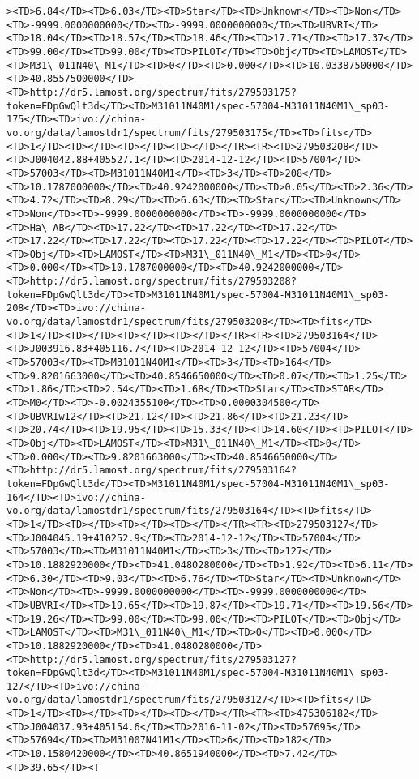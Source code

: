 \documentclass[11pt]{article}
\begin{document}
\begin{Verbatim}[commandchars=\\\{\}]
><TD>6.84</TD><TD>6.03</TD><TD>Star</TD><TD>Unknown</TD><TD>Non</TD><TD>-9999.0000000000</TD><TD>-9999.0000000000</TD><TD>UBVRI</TD><TD>18.04</TD><TD>18.57</TD><TD>18.46</TD><TD>17.71</TD><TD>17.37</TD><TD>99.00</TD><TD>99.00</TD><TD>PILOT</TD><TD>Obj</TD><TD>LAMOST</TD><TD>M31\_011N40\_M1</TD><TD>0</TD><TD>0.000</TD><TD>10.0338750000</TD><TD>40.8557500000</TD><TD>http://dr5.lamost.org/spectrum/fits/279503175?token=FDpGwQlt3d</TD><TD>M31011N40M1/spec-57004-M31011N40M1\_sp03-175</TD><TD>ivo://china-vo.org/data/lamostdr1/spectrum/fits/279503175</TD><TD>fits</TD><TD>1</TD><TD></TD><TD></TD><TD></TD></TR><TR><TD>279503208</TD><TD>J004042.88+405527.1</TD><TD>2014-12-12</TD><TD>57004</TD><TD>57003</TD><TD>M31011N40M1</TD><TD>3</TD><TD>208</TD><TD>10.1787000000</TD><TD>40.9242000000</TD><TD>0.05</TD><TD>2.36</TD><TD>4.72</TD><TD>8.29</TD><TD>6.63</TD><TD>Star</TD><TD>Unknown</TD><TD>Non</TD><TD>-9999.0000000000</TD><TD>-9999.0000000000</TD><TD>Ha\_AB</TD><TD>17.22</TD><TD>17.22</TD><TD>17.22</TD><TD>17.22</TD><TD>17.22</TD><TD>17.22</TD><TD>17.22</TD><TD>PILOT</TD><TD>Obj</TD><TD>LAMOST</TD><TD>M31\_011N40\_M1</TD><TD>0</TD><TD>0.000</TD><TD>10.1787000000</TD><TD>40.9242000000</TD><TD>http://dr5.lamost.org/spectrum/fits/279503208?token=FDpGwQlt3d</TD><TD>M31011N40M1/spec-57004-M31011N40M1\_sp03-208</TD><TD>ivo://china-vo.org/data/lamostdr1/spectrum/fits/279503208</TD><TD>fits</TD><TD>1</TD><TD></TD><TD></TD><TD></TD></TR><TR><TD>279503164</TD><TD>J003916.83+405116.7</TD><TD>2014-12-12</TD><TD>57004</TD><TD>57003</TD><TD>M31011N40M1</TD><TD>3</TD><TD>164</TD><TD>9.8201663000</TD><TD>40.8546650000</TD><TD>0.07</TD><TD>1.25</TD><TD>1.86</TD><TD>2.54</TD><TD>1.68</TD><TD>Star</TD><TD>STAR</TD><TD>M0</TD><TD>-0.0024355100</TD><TD>0.0000304500</TD><TD>UBVRIw12</TD><TD>21.12</TD><TD>21.86</TD><TD>21.23</TD><TD>20.74</TD><TD>19.95</TD><TD>15.33</TD><TD>14.60</TD><TD>PILOT</TD><TD>Obj</TD><TD>LAMOST</TD><TD>M31\_011N40\_M1</TD><TD>0</TD><TD>0.000</TD><TD>9.8201663000</TD><TD>40.8546650000</TD><TD>http://dr5.lamost.org/spectrum/fits/279503164?token=FDpGwQlt3d</TD><TD>M31011N40M1/spec-57004-M31011N40M1\_sp03-164</TD><TD>ivo://china-vo.org/data/lamostdr1/spectrum/fits/279503164</TD><TD>fits</TD><TD>1</TD><TD></TD><TD></TD><TD></TD></TR><TR><TD>279503127</TD><TD>J004045.19+410252.9</TD><TD>2014-12-12</TD><TD>57004</TD><TD>57003</TD><TD>M31011N40M1</TD><TD>3</TD><TD>127</TD><TD>10.1882920000</TD><TD>41.0480280000</TD><TD>1.92</TD><TD>6.11</TD><TD>6.30</TD><TD>9.03</TD><TD>6.76</TD><TD>Star</TD><TD>Unknown</TD><TD>Non</TD><TD>-9999.0000000000</TD><TD>-9999.0000000000</TD><TD>UBVRI</TD><TD>19.65</TD><TD>19.87</TD><TD>19.71</TD><TD>19.56</TD><TD>19.26</TD><TD>99.00</TD><TD>99.00</TD><TD>PILOT</TD><TD>Obj</TD><TD>LAMOST</TD><TD>M31\_011N40\_M1</TD><TD>0</TD><TD>0.000</TD><TD>10.1882920000</TD><TD>41.0480280000</TD><TD>http://dr5.lamost.org/spectrum/fits/279503127?token=FDpGwQlt3d</TD><TD>M31011N40M1/spec-57004-M31011N40M1\_sp03-127</TD><TD>ivo://china-vo.org/data/lamostdr1/spectrum/fits/279503127</TD><TD>fits</TD><TD>1</TD><TD></TD><TD></TD><TD></TD></TR><TR><TD>475306182</TD><TD>J004037.93+405154.6</TD><TD>2016-11-02</TD><TD>57695</TD><TD>57694</TD><TD>M31007N41M1</TD><TD>6</TD><TD>182</TD><TD>10.1580420000</TD><TD>40.8651940000</TD><TD>7.42</TD><TD>39.65</TD><T
\end{Verbatim}
\end{document}
